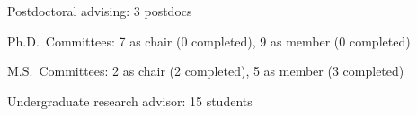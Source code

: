 \begin{veryTightItemize}
    \item Postdoctoral advising: 3 postdocs
    \item Ph.D.\ Committees: 7 as chair (0 completed), 9 as member (0 completed)
    \item M.S.\ Committees:  2 as chair (2 completed), 5 as member (3 completed)
    \item Undergraduate research advisor: 15 students
\end{veryTightItemize}
